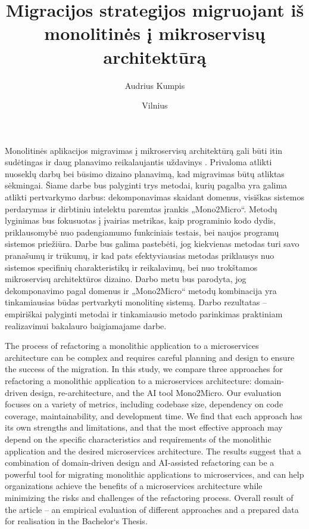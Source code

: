 \documentclass[fleqn]{VUMIFPSkursinis}
\title{Migracijos strategijos migruojant iš monolitinės į mikroservisų architektūrą}
\author{Audrius Kumpis}
\date{Vilnius \\ \the\year}
\begin{document}
\maketitle

\tableofcontents

Monolitinės aplikacijos migravimas į mikroservisų architektūrą gali būti itin sudėtingas ir daug planavimo reikalaujantis uždavinys \cite{FBZ+19}. Privaloma atlikti nuoseklų darbų bei būsimo dizaino planavimą, kad migravimas būtų atliktas sėkmingai. Šiame darbe bus palyginti trys metodai, kurių pagalba yra galima atlikti pertvarkymo darbus: dekomponavimas skaidant domenus, visiškas sistemos perdarymas ir dirbtiniu intelektu paremtas įrankis „Mono2Micro“. Metodų lyginimas bus fokusuotas į įvairias metrikas, kaip programinio kodo dydis, priklausomybė nuo padengiamumo funkciniais testais, bei naujos programų sistemos priežiūra. Darbe bus galima pastebėti, jog kiekvienas metodas turi savo pranašumų ir trūkumų, ir kad pats efektyviausias metodas priklausys nuo sistemos specifinių charakteristikų ir reikalavimų, bei nuo trokštamos mikroservisų architektūros dizaino. Darbo metu bus parodyta, jog dekomponavimo pagal domenus ir „Mono2Micro“ metodų kombinacija yra tinkamiausias būdas pertvarkyti monolitinę sistemą. Darbo rezultatas – empiriškai palyginti metodai ir tinkamiausio metodo parinkimas praktiniam realizavimui bakalauro baigiamajame darbe.

The process of refactoring a monolithic application to a microservices architecture can be complex and requires careful planning and design to ensure the success of the migration. In this study, we compare three approaches for refactoring a monolithic application to a microservices architecture: domain-driven design, re-architecture, and the AI tool Mono2Micro. Our evaluation focuses on a variety of metrics, including codebase size, dependency on code coverage, maintainability, and development time. We find that each approach has its own strengths and limitations, and that the most effective approach may depend on the specific characteristics and requirements of the monolithic application and the desired microservices architecture. The results suggest that a combination of domain-driven design and AI-assisted refactoring can be a powerful tool for migrating monolithic applications to microservices, and can help organizations achieve the benefits of a microservices architecture while minimizing the risks and challenges of the refactoring process. Overall result of the article – an empirical evaluation of different approaches and a prepared data for realisation in the Bachelor‘s Thesis.
\end{document}
